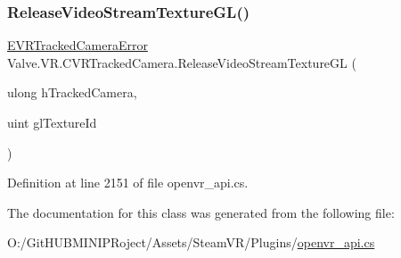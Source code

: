 \subsubsection{\texorpdfstring{ReleaseVideoStreamTextureGL()}{ReleaseVideoStreamTextureGL()}}
{\footnotesize\ttfamily \mbox{\hyperlink{namespace_valve_1_1_v_r_ad0e012e846f5d93848783c044614cfd3}{E\+V\+R\+Tracked\+Camera\+Error}} Valve.\+V\+R.\+C\+V\+R\+Tracked\+Camera.\+Release\+Video\+Stream\+Texture\+GL (\begin{DoxyParamCaption}\item[{ulong}]{h\+Tracked\+Camera,  }\item[{uint}]{gl\+Texture\+Id }\end{DoxyParamCaption})}



Definition at line 2151 of file openvr\+\_\+api.\+cs.



The documentation for this class was generated from the following file\+:\begin{DoxyCompactItemize}
\item 
O\+:/\+Git\+H\+U\+B\+M\+I\+N\+I\+P\+Roject/\+Assets/\+Steam\+V\+R/\+Plugins/\mbox{\hyperlink{openvr__api_8cs}{openvr\+\_\+api.\+cs}}\end{DoxyCompactItemize}
